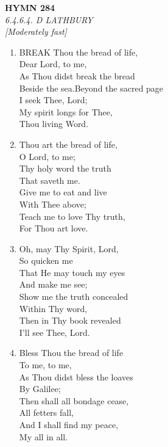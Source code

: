 \documentclass[11pt,a4paper]{article}
\begin{document}
\newpage
\begin{center}
    {\Large \textbf{HYMN 284}}
    \\
    \textit{6.4.6.4. D LATHBURY}
    \\
    \textit{\small [Moderately fast]}
\end{center}
\vspace{1em}

\begin{enumerate}
    \item BREAK Thou the bread of life, \\
        Dear Lord, to me, \\
        As Thou didst break the bread \\
        Beside the sea.Beyond the sacred page \\
        I seek Thee, Lord; \\
        My spirit longs for Thee, \\
        Thou living Word.

    \item Thou art the bread of life, \\
        O Lord, to me; \\
        Thy holy word the truth \\
        That saveth me. \\
        Give me to eat and live \\
        With Thee above; \\
        Teach me to love Thy truth, \\
        For Thou art love.

    \item Oh, may Thy Spirit, Lord, \\
        So quicken me \\
        That He may touch my eyes \\
        And make me see; \\
        Show me the truth concealed \\
        Within Thy word, \\
        Then in Thy book revealed \\
        I'll see Thee, Lord.

    \item Bless Thou the bread of life \\
        To me, to me, \\
        As Thou didst bless the loaves \\
        By Galilee; \\
        Then shall all bondage cease, \\
        All fetters fall, \\
        And I shall find my peace, \\
        My all in all.

\end{enumerate}
\end{document}
